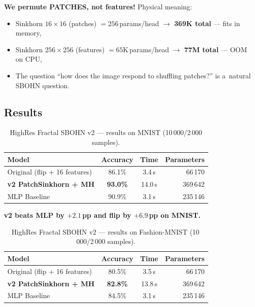 \documentclass[11pt,a4paper]{report}
\begin{document}
\textbf{We permute PATCHES, not features!} Physical meaning:
\begin{itemize}
\item Sinkhorn $16{\times}16$ (patches) $= 256$\,params/head $\to$ \textbf{369K total} --- fits in memory,
\item Sinkhorn $256{\times}256$ (features) $= 65$K\,params/head $\to$ \textbf{77M total} --- OOM on CPU,
\item The question ``how does the image respond to shuffling patches?'' is a~natural SBOHN question.
\end{itemize}

\subsection{Results}

\begin{table}[h]
\centering
\caption{HighRes Fractal SBOHN v2 --- results on MNIST (10\,000/2\,000 samples).}
\begin{tabular}{lccr}
\hline
\textbf{Model} & \textbf{Accuracy} & \textbf{Time} & \textbf{Parameters} \\
\hline
Original (flip + 16 features)           & 86.1\%          & 3.4\,s  & 66\,170 \\
\textbf{v2 PatchSinkhorn + MH}      & \textbf{93.0\%} & 14.0\,s & 369\,642 \\
MLP Baseline                        & 90.9\%          & 3.1\,s  & 235\,146 \\
\hline
\end{tabular}
\end{table}

\textbf{v2 beats MLP by $+2.1$\,pp and flip by $+6.9$\,pp on MNIST.}

\begin{table}[h]
\centering
\caption{HighRes Fractal SBOHN v2 --- results on Fashion-MNIST (10\,000/2\,000 samples).}
\begin{tabular}{lccr}
\hline
\textbf{Model} & \textbf{Accuracy} & \textbf{Time} & \textbf{Parameters} \\
\hline
Original (flip + 16 features)           & 80.5\%          & 3.5\,s  & 66\,170 \\
\textbf{v2 PatchSinkhorn + MH}      & \textbf{82.8\%} & 13.8\,s & 369\,642 \\
MLP Baseline                        & 84.5\%          & 3.1\,s  & 235\,146 \\
\hline
\end{tabular}
\end{table}
\end{document}
